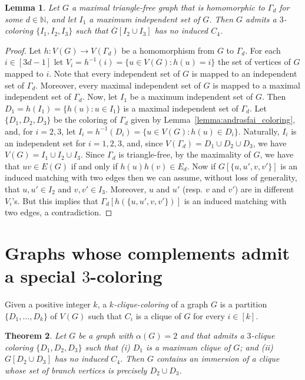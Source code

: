 \documentclass[a4paper,12pt]{article}
\newtheorem{theorem}{Theorem}
\newtheorem{lemma}[theorem]{Lemma}
\begin{document}
\begin{lemma}\label{lemma:andrasfai_blowup_coloring}
	Let \(G\) a maximal triangle-free graph that is homomorphic to \(\Gamma_d\)
	for some \(d\in \mathbb{N}\),
	and let \(I_1\) a maximum independent set of \(G\).
	Then \(G\) admits a \(3\)-coloring \(\{I_1,I_2,I_3\}\)
	such that \(\overline{G}[I_2\cup I_3]\) has no induced \(C_4\).
\end{lemma}

\begin{proof}
	Let \(h \colon V(G) \to V(\Gamma_d)\) be a homomorphism from \(G\) to \(\Gamma_d\).
	For each \(i\in [3d-1]\) let \(V_i = h^{-1}(i) = \{u\in V(G) : h(u) = i\}\)
	the set of vertices of \(G\) mapped to \(i\).
	Note that every independent set of \(G\) is mapped to an independent set of \(\Gamma_d\).
	Moreover, every maximal independent set of \(G\) is mapped to a maximal independent set of \(\Gamma_d\).
	Now, let \(I_1\) be a maximum independent set of \(G\).
	Then \(D_1 = h(I_1) = \{h(u) : u \in I_1\}\) is a maximal independent set of \(\Gamma_d\).
	Let \(\{D_1,D_2,D_3\}\) be the coloring of \(\Gamma_d\) given by Lemma~\ref{lemma:andrasfai_coloring},
	and, for \(i = 2,3\), let \(I_i = h^{-1}(D_i) = \{u \in V(G) : h(u) \in D_i\}\).
	Naturally, \(I_i\) is an independent set for \(i = 1,2,3\),
	and, since \(V(\Gamma_d) = D_1\cup D_2\cup D_3\),
	we have \(V(G) = I_1 \cup I_2 \cup I_3\).
	Since \(\Gamma_d\) is triangle-free,
	by the maximality of \(G\), 
	we have that \(uv\in E(G)\) if and only if \(h(u)h(v)\in E_d\).
	Now if \(G[\{u,u',v,v'\}]\) is an induced matching with two edges
	then we can assume, without loss of generality,
	that \(u,u' \in I_2\) and \(v,v'\in I_3\).
	Moreover, \(u\) and \(u'\) (resp. \(v\) and \(v'\)) are in different \(V_i\)'s.
	But this implies that \(\Gamma_d[h(\{u,u',v,v'\})]\) is an induced matching with two edges,
	a contradiction.
\end{proof}


\section{Graphs whose complements admit a special \(3\)-coloring}

\newcommand{\Gcompl}{\overline{G}}

Given a positive integer \(k\),
a \emph{\(k\)-clique-coloring} of a graph \(G\) is a partition \(\{D_1,\ldots, D_k\}\) of \(V(G)\)
such that \(C_i\) is a clique of \(G\) for every \(i\in[k]\).

\begin{theorem}\label{thm:graphs_with_special_clique_coloring}
	Let \(G\) be a graph with \(\alpha(G) = 2\)
	and that admits a \(3\)-clique coloring \(\{D_1,D_2,D_3\}\) such that
	(i) \(D_1\) is a maximum clique of \(G\); and
	(ii) \(G[D_2\cup D_3]\) has no induced \(C_4\).
	Then \(G\) contains an immersion of a clique whose set of branch vertices is precisely \(D_2\cup D_3\).
\end{theorem}
\end{document}
